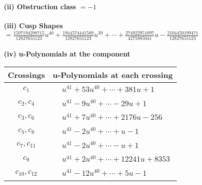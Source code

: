 \documentclass[1p]{elsarticle_modified}
\theoremstyle{definition}
\begin{document}
\flushleft \textbf{(ii) Obstruction class $= -1$}\\~\\
\flushleft \textbf{(iii) Cusp Shapes $= \frac{1507194298715}{12827655123} u^{40}+\frac{1944574441589}{12827655123} u^{39}+\cdots+\frac{274922951097}{4275885041} u-\frac{2104450199471}{12827655123}$}\\~\\
\newpage\renewcommand{\arraystretch}{1}
\flushleft \textbf{(iv) u-Polynomials at the component}\newline \\
\begin{tabular}{m{50pt}|m{274pt}}
Crossings & \hspace{64pt}u-Polynomials at each crossing \\
\hline $$\begin{aligned}c_{1}\end{aligned}$$&$\begin{aligned}
&u^{41}+53 u^{40}+\cdots+381 u+1
\end{aligned}$\\
\hline $$\begin{aligned}c_{2},c_{4}\end{aligned}$$&$\begin{aligned}
&u^{41}-9 u^{40}+\cdots-29 u+1
\end{aligned}$\\
\hline $$\begin{aligned}c_{3},c_{6}\end{aligned}$$&$\begin{aligned}
&u^{41}+7 u^{40}+\cdots+2176 u-256
\end{aligned}$\\
\hline $$\begin{aligned}c_{5},c_{8}\end{aligned}$$&$\begin{aligned}
&u^{41}-2 u^{40}+\cdots+u-1
\end{aligned}$\\
\hline $$\begin{aligned}c_{7},c_{11}\end{aligned}$$&$\begin{aligned}
&u^{41}-2 u^{40}+\cdots- u+1
\end{aligned}$\\
\hline $$\begin{aligned}c_{9}\end{aligned}$$&$\begin{aligned}
&u^{41}+2 u^{40}+\cdots+12241 u+8353
\end{aligned}$\\
\hline $$\begin{aligned}c_{10},c_{12}\end{aligned}$$&$\begin{aligned}
&u^{41}-12 u^{40}+\cdots+5 u-1
\end{aligned}$\\
\hline
\end{tabular}\\~\\
\end{document}

